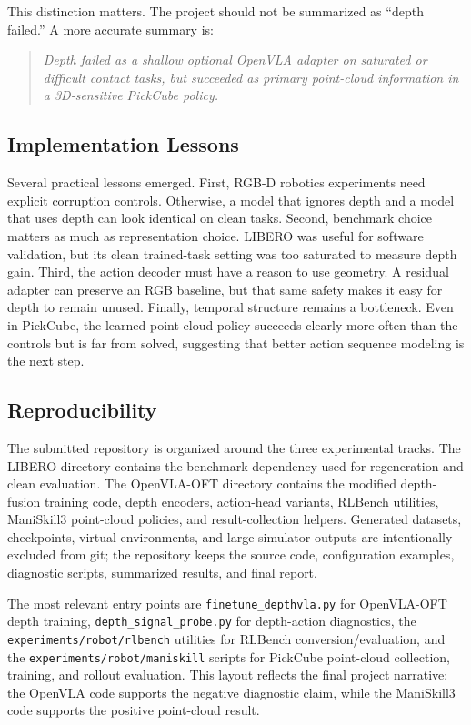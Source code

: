 \documentclass[conference]{IEEEtran}
\begin{document}
This distinction matters. The project should not be summarized as ``depth failed.'' A more accurate summary is:
\begin{quote}
\emph{Depth failed as a shallow optional OpenVLA adapter on saturated or difficult contact tasks, but succeeded as primary point-cloud information in a 3D-sensitive PickCube policy.}
\end{quote}

\subsection{Implementation Lessons}

Several practical lessons emerged. First, RGB-D robotics experiments need explicit corruption controls. Otherwise, a model that ignores depth and a model that uses depth can look identical on clean tasks. Second, benchmark choice matters as much as representation choice. LIBERO was useful for software validation, but its clean trained-task setting was too saturated to measure depth gain. Third, the action decoder must have a reason to use geometry. A residual adapter can preserve an RGB baseline, but that same safety makes it easy for depth to remain unused. Finally, temporal structure remains a bottleneck. Even in PickCube, the learned point-cloud policy succeeds clearly more often than the controls but is far from solved, suggesting that better action sequence modeling is the next step.

\subsection{Reproducibility}

The submitted repository is organized around the three experimental tracks. The LIBERO directory contains the benchmark dependency used for regeneration and clean evaluation. The OpenVLA-OFT directory contains the modified depth-fusion training code, depth encoders, action-head variants, RLBench utilities, ManiSkill3 point-cloud policies, and result-collection helpers. Generated datasets, checkpoints, virtual environments, and large simulator outputs are intentionally excluded from git; the repository keeps the source code, configuration examples, diagnostic scripts, summarized results, and final report.

The most relevant entry points are \texttt{finetune\_depthvla.py} for OpenVLA-OFT depth training, \texttt{depth\_signal\_probe.py} for depth-action diagnostics, the \texttt{experiments/robot/rlbench} utilities for RLBench conversion/evaluation, and the \texttt{experiments/robot/maniskill} scripts for PickCube point-cloud collection, training, and rollout evaluation. This layout reflects the final project narrative: the OpenVLA code supports the negative diagnostic claim, while the ManiSkill3 code supports the positive point-cloud result.
\end{document}
